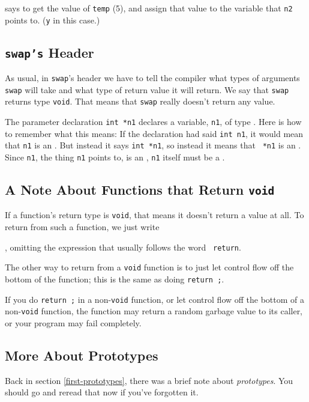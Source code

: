 \noindent says to get the value of {\tt temp} (5), and
assign that value to the variable that {\tt n2} points to.  ({\tt y} in
this case.)

\subsection{{\tt swap's} Header}

As usual, in {\tt swap}'s header we have to tell the compiler what types
of arguments {\tt swap} will take and what type of return value it will
return.  We say that {\tt swap} returns type {\tt void}.  That means
that {\tt swap} really doesn't return any value.

The parameter declaration {\tt int *n1} declares a variable, {\tt n1},
of type \Int.  Here is how to remember what this means:  If the
declaration had said {\tt int n1}, it would mean that {\tt n1} is an
\int.  But instead it says {\tt int *n1}, so instead it means that {\tt
*n1} is an \int.  Since {\tt *n1}, the thing {\tt n1} points to, is an
\int, {\tt n1} itself must be a \Int.

\subsection{A Note About Functions that Return {\tt void}}

If a function's return type is {\tt void}, that means it doesn't return
a value at all.  To return from such a function, we just write 

\begin{flushleft}
\verb% return ; %
\end{flushleft}

\noindent , omitting the expression that usually follows the word {\tt
return}.

The other way to return from a {\tt void} function is to just let
control flow off the bottom of the function; this is the same as doing
{\tt return~;}.  

If you do {\tt return~;} in a non-{\tt void} function, or let control
flow off the bottom of a non-{\tt void} function, the function may
return a random garbage value to its caller, or your program may fail
completely.

\subsection{More About Prototypes}

Back in section \ref{first-prototypes}, there was a brief note about
{\em prototypes}\/.  You should go and reread that now if you've
forgotten it.

